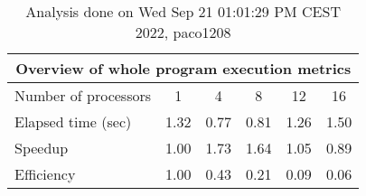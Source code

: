 \begin{table}[h]
\begin{center}
\begin{tabular}{|l|c|c|c|c|c|}
\hline
\multicolumn{6}{|c|}{Overview of whole program execution metrics} \\
\hline
\hline
Number of processors & 1 & 4 & 8 & 12 & 16 \\
\hline
Elapsed time (sec)      &       1.32 &       0.77 &       0.81 &       1.26 &       1.50 \\
\hline
Speedup                 &       1.00 &       1.73 &       1.64 &       1.05 &       0.89 \\
\hline
Efficiency              &       1.00 &       0.43 &       0.21 &       0.09 &       0.06 \\
\hline
\end{tabular}
\end{center}
\caption{ Analysis done on Wed Sep 21 01:01:29 PM CEST 2022, paco1208}
\end{table}
